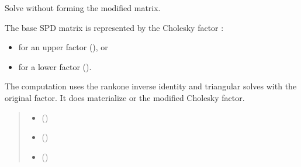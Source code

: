 \documentclass[a4paper,11pt,english]{sphinxmanual}
\begin{document}
\begin{fulllineitems}
\label{\detokenize{generated/cholrot.solve_rank1:cholrot.solve_rank1}}
\pysigstartsignatures
\pysiglinewithargsret
{}
{\sphinxparamcomma {}\sphinxparamcomma {}\sphinxparamcomma {}\sphinxparamcomma {}\sphinxparamcomma {}\sphinxparamcomma {}}
{}
\pysigstopsignatures
\sphinxAtStartPar
Solve  without forming the modified matrix.

\sphinxAtStartPar
The base SPD matrix  is represented by the Cholesky factor :
\begin{itemize}
\item {} 
\sphinxAtStartPar
{} for an upper factor (), or

\item {} 
\sphinxAtStartPar
{} for a lower factor ().

\end{itemize}

\sphinxAtStartPar
The computation uses the rank\sphinxhyphen{}one inverse identity and triangular solves
with the original factor. It does  materialize  or
the modified Cholesky factor.
\begin{quote}\begin{description}
\begin{itemize}
\item {} 
\sphinxAtStartPar
{} ()

\item {} 
\sphinxAtStartPar
{} ()

\item {} 
\sphinxAtStartPar
{} ()


\end{itemize}
\end{description}
\end{quote}
\end{fulllineitems}
\end{document}
